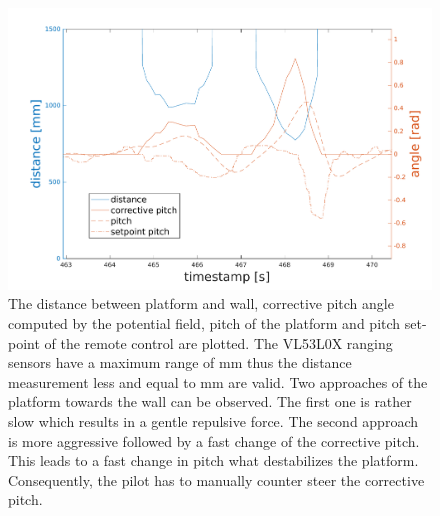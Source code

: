 \begin{figure}
	\centering
	\includegraphics[width=0.9\linewidth]{pictures/plot_pf_test.pdf}
	\caption{The distance between platform and wall, corrective pitch angle computed by the potential field, pitch of the platform and pitch set-point of the remote control are plotted. The VL53L0X ranging sensors have a maximum range of \unit[1200]{mm} thus the distance measurement less and equal to \unit[1200]{mm} are valid. Two approaches of the platform towards the wall can be observed. The first one is rather slow which results in a gentle repulsive force. The second approach is more aggressive followed by a fast change of the corrective pitch. This leads to a fast change in pitch what destabilizes the platform.    Consequently, the pilot has to manually counter steer the corrective pitch.}
	\label{fig:pf test}
\end{figure}


